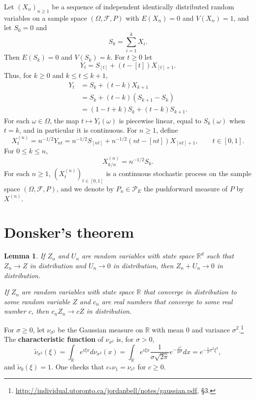 \documentclass{article}
\newtheorem{lemma}[theorem]{Lemma}
\theoremstyle{definition}
\begin{document}
Let $(X_n)_{n \geq 1}$ be a sequence of independent identically distributed random variables on a sample space
$(\Omega,\mathscr{F},P)$ with $E(X_n)=0$ and $V(X_n)=1$, and let $S_0=0$ and
\[
S_k = \sum_{i=1}^k X_i.
\]
Then $E(S_k)=0$ and $V(S_k) = k$. 
For $t \geq 0$ let 
\[
Y_t = S_{[t]} + (t-[t]) X_{[t]+1}.
\]
Thus, for $k \geq 0$ and $k \leq t \leq k+1$,
\begin{align*}
Y_t &= S_k + (t-k) X_{k+1}\\
& = S_k + (t-k) (S_{k+1}-S_k)\\
& = (1-t+k)S_k +(t-k)S_{k+1}.
\end{align*}
For each $\omega \in \Omega$, the map $t \mapsto Y_t(\omega)$ is piecewise linear, equal to $S_k(\omega)$ when $t=k$, and in particular
it is continuous. 
For $n \geq 1$, define
\begin{equation}
X_t^{(n)} = n^{-1/2} Y_{nt} = n^{-1/2} S_{[nt]} + n^{-1/2}(nt-[nt])X_{[nt]+1}, \qquad t \in [0,1].
\label{Xtn}
\end{equation}
For $0 \leq k \leq n$,
\[
X_{k/n}^{(n)} = n^{-1/2} S_k.
\]
For each $n \geq 1$, $(X^{(n)}_t)_{t \in [0,1]}$ is a continuous stochastic process on the sample space $(\Omega,\mathscr{F},P)$, and we denote
by $P_n \in \mathscr{P}_E$ the pushforward measure of $P$ by $X^{(n)}$. 




\section{Donsker's theorem}
\begin{lemma}
If $Z_n$ and $U_n$ are random variables with state space $\mathbb{R}^d$ such that
$Z_n \to Z$ in distribution and $U_n \to 0$ in distribution, then $Z_n + U_n \to 0$ in distribution.

If $Z_n$ are random variables  with state space $\mathbb{R}$ that converge
in distribution to some random variable $Z$ and $c_n$ are real numbers that converge to some real number $c$, then
$c_n Z_n \to cZ$ in distribution. 
\label{191}
\end{lemma}

For $\sigma \geq 0$, let $\nu_{\sigma^2}$ be the Gaussian measure on $\mathbb{R}$ with mean $0$ and
variance $\sigma^2$.\footnote{\url{http://individual.utoronto.ca/jordanbell/notes/gaussian.pdf},
\S 3.}
The \textbf{characteristic function} of $\nu_{\sigma^2}$ is, for $\sigma > 0$,
\[
\widetilde{\nu}_{\sigma^2}(\xi) = \int_{\mathbb{R}} e^{i\xi x} d\nu_{\sigma^2}(x) = 
\int_{\mathbb{R}} e^{i\xi x} \frac{1}{\sigma \sqrt{2\pi}} e^{-\frac{x^2}{2\sigma^2}} dx
=e^{-\frac{1}{2}\sigma^2 \xi^2},
\]
and $\widetilde{\nu}_0(\xi) = 1$. One checks that $c_* \nu_1 = \nu_{c^2}$ for $c \geq 0$. 
\end{document}
